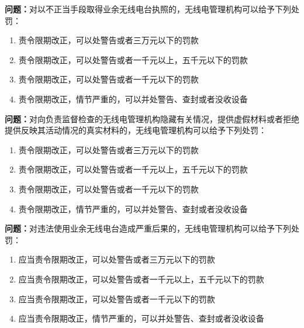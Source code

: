 \textbf{问题：}对以不正当手段取得业余无线电台执照的，无线电管理机构可以给予下列处罚：
\begin{enumerate}[label=\Alph*), leftmargin=1cm]
  \item 责令限期改正，可以处警告或者三万元以下的罚款
  \item 责令限期改正，可以处警告或者一千元以上，五千元以下的罚款
  \item 责令限期改正，可以处警告或者一千元以下的罚款
  \item 责令限期改正，情节严重的，可以并处警告、查封或者没收设备
\end{enumerate}

\textbf{问题：}对向负责监督检查的无线电管理机构隐藏有关情况，提供虚假材料或者拒绝提供反映其活动情况的真实材料的，无线电管理机构可以给予下列处罚：
\begin{enumerate}[label=\Alph*), leftmargin=1cm]
  \item 责令限期改正，可以处警告或者三万元以下的罚款
  \item 责令限期改正，可以处警告或者一千元以上，五千元以下的罚款
  \item 责令限期改正，可以处警告或者一千元以下的罚款
  \item 责令限期改正，情节严重的，可以并处警告、查封或者没收设备
\end{enumerate}

\textbf{问题：}对违法使用业余无线电台造成严重后果的，无线电管理机构可以给予下列处罚：
\begin{enumerate}[label=\Alph*), leftmargin=1cm]
  \item 应当责令限期改正，可以处警告或者三万元以下的罚款
  \item 应当责令限期改正，可以处警告或者一千元以上，五千元以下的罚款
  \item 应当责令限期改正，可以处警告或者一千元以下的罚款
  \item 应当责令限期改正，情节严重的，可以并处警告、查封或者没收设备
\end{enumerate}
